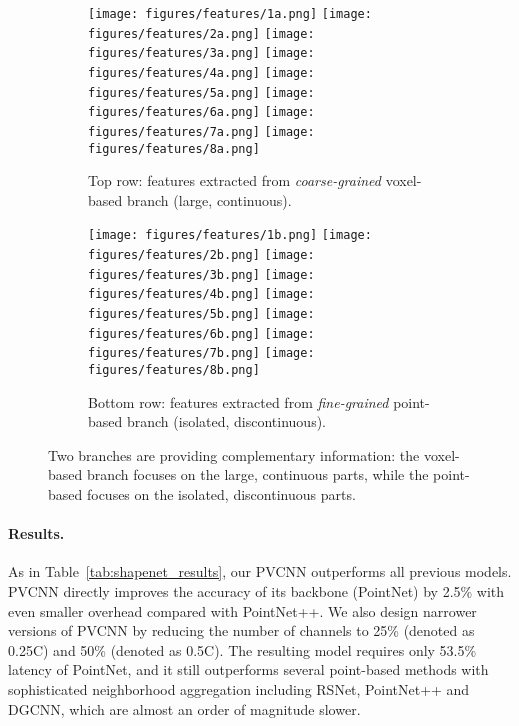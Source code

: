 \documentclass{article}
\newcommand{\tab}[1]{Table~\ref{#1}}
\newcommand{\myparagraph}[1]{\vspace{-6pt}\paragraph{#1}}
\def\modelshort{PVCNN\xspace}
\begin{document}
 \begin{figure}[!t]
\centering
\begin{subfigure}[b]{\linewidth}
    \centering
    \caption{Top row: features extracted from \emph{coarse-grained} voxel-based branch (large, continuous).}
    \texttt{[image: figures/features/1a.png]}
    \texttt{[image: figures/features/2a.png]}
    \texttt{[image: figures/features/3a.png]}
    \texttt{[image: figures/features/4a.png]}
    \texttt{[image: figures/features/5a.png]}
    \texttt{[image: figures/features/6a.png]}
    \texttt{[image: figures/features/7a.png]}
    \texttt{[image: figures/features/8a.png]}
\end{subfigure}
\begin{subfigure}[b]{\linewidth}
    \centering
    \texttt{[image: figures/features/1b.png]}
    \texttt{[image: figures/features/2b.png]}
    \texttt{[image: figures/features/3b.png]}
    \texttt{[image: figures/features/4b.png]}
    \texttt{[image: figures/features/5b.png]}
    \texttt{[image: figures/features/6b.png]}
    \texttt{[image: figures/features/7b.png]}
    \texttt{[image: figures/features/8b.png]}
    \caption{Bottom row: features extracted from \emph{fine-grained} point-based branch (isolated, discontinuous).}
\end{subfigure}
\caption{Two branches are providing complementary information: the voxel-based branch focuses on the large, continuous parts, while the point-based focuses on the isolated, discontinuous parts.}
\label{fig:shapenet_features}
\vspace{-10pt}
\end{figure} 
\myparagraph{Results.}

As in \tab{tab:shapenet_results}, our \modelshort outperforms all previous models. \modelshort directly improves the accuracy of its backbone (PointNet) by 2.5\% with even smaller overhead compared with PointNet++. We also design narrower versions of \modelshort by reducing the number of channels to 25\% (denoted as 0.25C) and 50\% (denoted as 0.5C). The resulting model requires only 53.5\% latency of PointNet, and it still outperforms several point-based methods with sophisticated neighborhood aggregation including RSNet, PointNet++ and DGCNN, which are almost an order of magnitude slower.
\end{document}
